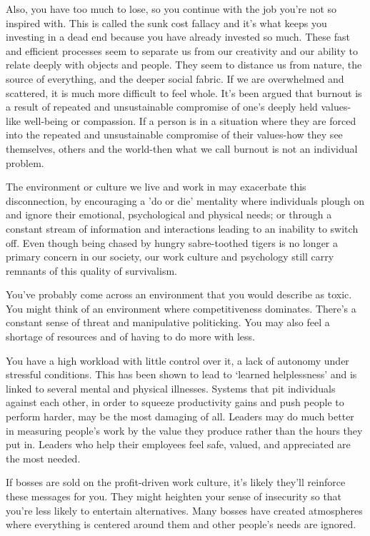 \documentclass[ebook,12pt,oneside,openany]{memoir}
\begin{document}
Also, you have too much to lose, so you continue with the job you're not so inspired with. This is called the sunk cost fallacy and it's what keeps you investing in a dead end because you have already invested so much.
These fast and efficient processes seem to separate us from our creativity and our ability to relate deeply with objects and people. They seem to distance us from nature, the source of everything, and the deeper social fabric.
If we are overwhelmed and scattered, it is much more difficult to feel whole. 
It's been argued that burnout is a result of repeated and unsustainable compromise of one's deeply held values-like well-being or compassion. 
If a person is in a situation where they are forced into the repeated and unsustainable compromise of their values-how they see themselves, others and the world-then what we call burnout is not an individual problem.

The environment or culture we live and work in may exacerbate this disconnection, by encouraging a 'do or die' mentality where individuals plough on and ignore their emotional, psychological and physical needs; or through a constant stream of information and interactions leading to an inability to switch off.
Even though being chased by hungry sabre-toothed tigers is no longer a primary concern in our society, our work culture and psychology still carry remnants of this quality of survivalism.

You've probably come across an environment that you would describe as toxic. You might think of an environment where competitiveness dominates. There's a constant sense of threat and manipulative politicking.
You may also feel a shortage of resources and of having to do more with less.

You have a high workload with little control over it, a lack of autonomy under stressful conditions. This has been shown to lead to `learned helplessness' and is linked to several mental and physical illnesses.
Systems that pit individuals against each other, in order to squeeze productivity gains and push people to perform harder, may be the most damaging of all.
Leaders may do much better in measuring people's work by the value they produce rather than the hours they put in.
Leaders who help their employees feel safe, valued, and appreciated are the most needed.

If bosses are sold on the profit-driven work culture, it's likely they'll reinforce these messages for you.
They might heighten your sense of insecurity so that you're less likely to entertain alternatives.
Many bosses have created atmospheres where everything is centered around them and other people's needs are ignored.
\end{document}
